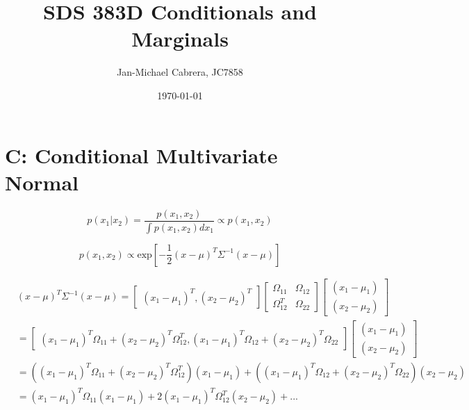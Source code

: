 \documentclass[12pt]{article}
\begin{document}
    \title{SDS 383D Conditionals and Marginals}
    \author{Jan-Michael Cabrera, JC7858}
    \date{\today}
    \maketitle

    \section*{C: Conditional Multivariate Normal}

        \begin{equation}
            p(x_1|x_2) = \frac{p(x_1, x_2)}{\int p(x_1, x_2) dx_1} \propto p(x_1, x_2)
        \end{equation}

        \begin{equation}
            p(x_1, x_2) \propto \text{exp} \left [ -\frac{1}{2} (x - \mu)^T \Sigma^{-1}(x - \mu)\right]
        \end{equation}

        \begin{align}
            & (x - \mu)^T \Sigma^{-1}(x - \mu) = \begin{bmatrix} (x_1 - \mu_1)^T, (x_2 - \mu_2)^T \end{bmatrix} \begin{bmatrix} \Omega_{11} & \Omega_{12} \\ \Omega_{12}^T & \Omega_{22} \end{bmatrix} \begin{bmatrix} (x_1 - \mu_1) \\ (x_2 - \mu_2) \end{bmatrix} \\
            & = \begin{bmatrix} (x_1 - \mu_1)^T \Omega_{11} + (x_2 - \mu_2)^T \Omega_{12}^T, (x_1 - \mu_1)^T \Omega_{12} + (x_2 - \mu_2)^T \Omega_{22} \end{bmatrix} \begin{bmatrix} (x_1 - \mu_1) \\ (x_2 - \mu_2)\end{bmatrix} \\
            & = ((x_1 - \mu_1)^T \Omega_{11} + (x_2 - \mu_2)^T \Omega_{12}^T)(x_1 - \mu_1) + ((x_1 - \mu_1)^T \Omega_{12} + (x_2 - \mu_2)^T \Omega_{22})(x_2 - \mu_2) \\
            & = (x_1 - \mu_1)^T \Omega_{11} (x_1 - \mu_1) + 2 (x_1 - \mu_1)^T \Omega_{12}^T (x_2 - \mu_2) + ...
        \end{align}
\end{document}
